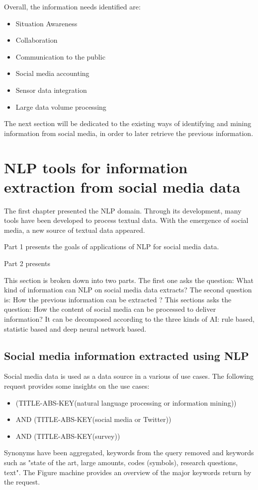 Overall, the information needs identified are:

\begin{itemize}
    \item Situation Awareness
    \item Collaboration
    \item Communication to the public
    \item Social media accounting
    \item Sensor data integration
    \item Large data volume processing
\end{itemize}

The next section will be dedicated to the existing ways of identifying and mining information from social media, in order to later retrieve the previous information.

\section{NLP tools for information extraction from social media data}
The first chapter presented the NLP domain.
Through its development, many tools have been developed to process textual data.
With the emergence of social media, a new source of textual data appeared.

Part 1 presents the goals of applications of NLP for social media data.

Part 2 presents

This section is broken down into two parts.
The first one asks the question: What kind of information can NLP on social media data extracts?
The second question is: How the previous information can be extracted ?
This sections asks the question: How the content of social media can be processed to deliver information?
It can be decomposed according to the three kinds of AI: rule based, statistic based and deep neural network based.

\subsection{Social media information extracted using NLP}
Social media data is used as a data source in a various of use cases.
The following request provides some insights on the use cases:
\begin{itemize}
    \item (TITLE-ABS-KEY({natural language processing} or {information mining}))
    \item AND (TITLE-ABS-KEY({social media} or Twitter))
    \item AND (TITLE-ABS-KEY(survey))
\end{itemize}
Synonyms have been aggregated, keywords from the query removed and keywords such as "state of the art, large amounts, codes (symbols), research questions, text".
The Figure machine provides an overview of the major keywords return by the request.

